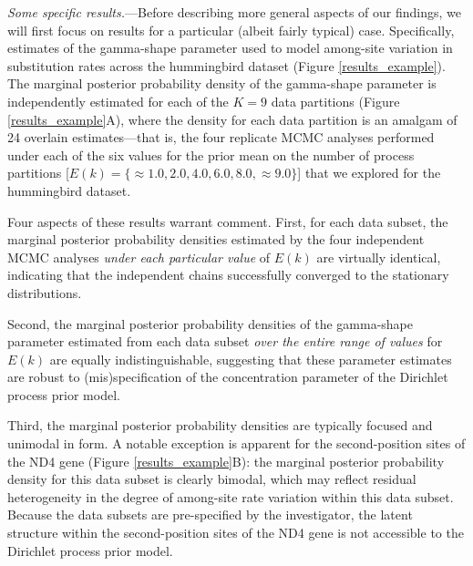 \documentclass[11pt]{article}
\begin{document}
\bigskip
\noindent
{\it Some specific results.}---Before describing more general aspects of our findings, we will first focus on results for a particular (albeit fairly typical) case.  Specifically, estimates of the gamma-shape parameter used to model among-site variation in substitution rates across the hummingbird dataset (Figure \ref{results_example}).
The marginal posterior probability density of the gamma-shape parameter is independently estimated for each of the $K = 9$ data partitions (Figure \ref{results_example}A), where the density for each data partition is an amalgam of 24 overlain estimates---that is, the four replicate MCMC analyses performed under each of the six values for the prior mean on the number of process partitions [$E(k) = \{\approx 1.0, 2.0, 4.0, 6.0, 8.0, \approx 9.0\}$] that we explored for the hummingbird dataset.

Four aspects of these results warrant comment.  
First, for each data subset, the marginal posterior probability densities estimated by the four independent MCMC analyses {\it under each particular value} of $E(k)$ are virtually identical, indicating that the independent chains successfully converged to the stationary distributions.

Second, the marginal posterior probability densities of the gamma-shape parameter estimated from each data subset {\it over the entire range of values} for $E(k)$ are equally indistinguishable, suggesting that these parameter estimates are robust to (mis)specification of the concentration parameter of the Dirichlet process prior model.

Third, the marginal posterior probability densities are typically focused and unimodal in form.
A notable exception is apparent for the second-position sites of the ND4 gene (Figure \ref{results_example}B): the marginal posterior probability density for this data subset is clearly bimodal, which may reflect residual heterogeneity in the degree of among-site rate variation within this data subset.  
Because the data subsets are pre-specified by the investigator, the latent structure within the second-position sites of the ND4 gene is not accessible to the Dirichlet process prior model.
\end{document}
